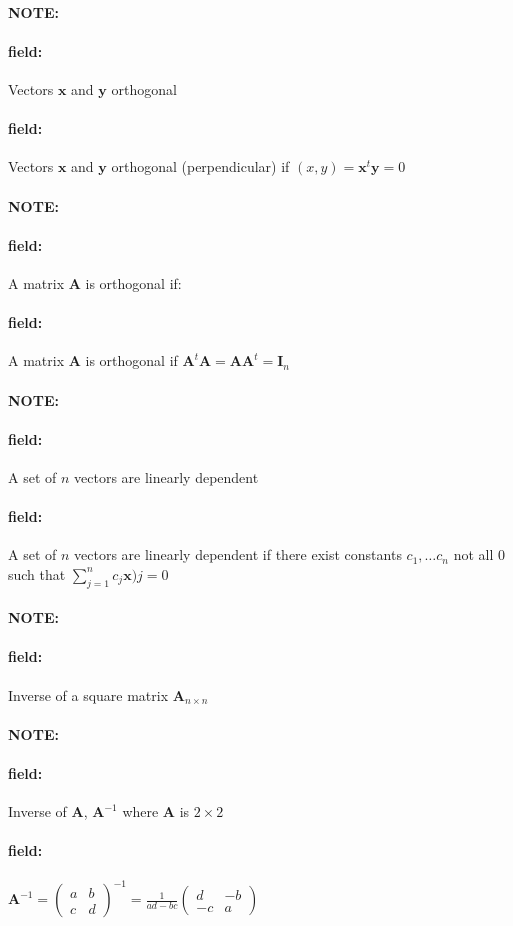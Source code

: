 \documentclass[12pt]{article}
\newenvironment{note}{\paragraph{NOTE:}}{}
\newenvironment{field}{\paragraph{field:}}{}
\begin{document}
\begin{note}
  \begin{field}
    Vectors $\mathbf{x}$ and $\mathbf{y}$ orthogonal
  \end{field}
  \begin{field}
    Vectors $\mathbf{x}$ and $\mathbf{y}$ orthogonal (perpendicular) if $(x,y) = \mathbf{x}^t \mathbf{y} = 0$
  \end{field}
\end{note}

\begin{note}
  \begin{field}
    A matrix $\mathbf{A}$ is orthogonal if:
  \end{field}
  \begin{field}
    A matrix $\mathbf{A}$ is orthogonal if $\mathbf{A}^t \mathbf{A} = \mathbf{A} \mathbf{A}^t = \mathbf{I}_n$
  \end{field}
\end{note}

\begin{note}
  \begin{field}
    A set of $n$ vectors are linearly dependent
  \end{field}
  \begin{field}
    A set of $n$ vectors are linearly dependent if there exist constants $c_1, \ldots c_n$ not all 0 such that $\sum_{j=1}^n c_j \mathbf{x})j = 0$
  \end{field}
\end{note}

\begin{note}
  \begin{field}
    Inverse of a square matrix $\mathbf{A}_{n\times n}$
  \end{field}
\end{note}

\begin{note}
  \begin{field}
    Inverse of $\mathbf{A}$, $\mathbf{A}^{-1}$ where $\mathbf{A}$ is $2 \times 2$
  \end{field}
  \begin{field}
    $\mathbf{A}^{-1} = \begin{pmatrix}
      a & b \\ c & d
    \end{pmatrix}^{-1} = \frac{1}{ad - bc}\begin{pmatrix}
      d & -b \\ -c & a
    \end{pmatrix}$
  \end{field}
\end{note}
\end{document}
